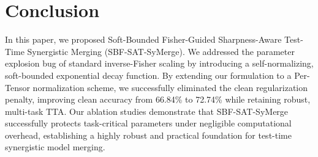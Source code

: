\documentclass{article}
\theoremstyle{plain}
\theoremstyle{definition}
\theoremstyle{remark}
\begin{document}
\section{Conclusion}
\label{sec:conclusion}
In this paper, we proposed Soft-Bounded Fisher-Guided Sharpness-Aware Test-Time Synergistic Merging (SBF-SAT-SyMerge). We addressed the parameter explosion bug of standard inverse-Fisher scaling by introducing a self-normalizing, soft-bounded exponential decay function. By extending our formulation to a Per-Tensor normalization scheme, we successfully eliminated the clean regularization penalty, improving clean accuracy from 66.84\% to 72.74\% while retaining robust, multi-task TTA. Our ablation studies demonstrate that SBF-SAT-SyMerge successfully protects task-critical parameters under negligible computational overhead, establishing a highly robust and practical foundation for test-time synergistic model merging.



\end{document}
